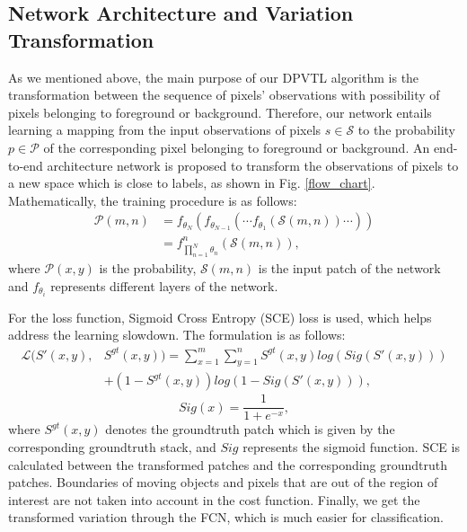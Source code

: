 \documentclass[journal]{IEEEtran}
\newcommand{\reffig}[1]{Fig. \ref{#1}}
\begin{document}
\subsection*{Network Architecture and Variation Transformation}
As we mentioned above,
the main purpose of our DPVTL algorithm is the transformation between the sequence of pixels' observations with possibility of pixels belonging to foreground or background.
Therefore,
our network entails learning a mapping from the input observations of pixels $s \in \mathcal{S}$ 
to the probability $p \in \mathcal{P}$ of the corresponding pixel belonging to foreground or background.
%
An end-to-end architecture network is proposed to transform the observations of pixels to a new space which is close to labels, as shown in \reffig{flow_chart}.
%
Mathematically, the training procedure is as follows:
\begin{equation}
    \begin{split}
        \mathcal{P}(m,n) & = f_{\theta_N} ( f_{\theta_{N - 1}} ( \cdots f_{\theta_1} ( \mathcal{S}(m,n)) \cdots  ) )  \\
          & = f_{ \prod_{n=1}^{N}\theta_n   }^n(\mathcal{S}(m,n)),
    \end{split}
\end{equation}
where $\mathcal{P}(x,y)$ is the probability, $\mathcal{S}(m,n)$ is the input patch of the network and $f_{\theta_i}$ represents different layers of the network.

For the loss function, Sigmoid Cross Entropy (SCE) loss is used, which helps address the learning slowdown. 
The formulation is as follows:
\begin{equation}
    \begin{split}
         \mathcal{L}(S'(x,y),& S^{gt}(x,y))  =  \sum_{x=1}^{m}\sum_{y=1}^{n} S^{gt}(x,y) log(Sig(S'(x,y)))  \\
        & + (1 - S^{gt}(x,y)) log(1 - Sig(S'(x,y))), 
    \end{split}
\end{equation}
\begin{equation}
       Sig(x) =\frac{1}{1+e^{-x}},
\end{equation}
where $S^{gt}(x,y)$ denotes the groundtruth patch which is given by the corresponding groundtruth stack, and $Sig$ represents the sigmoid function. 
SCE is calculated between the transformed patches and the corresponding groundtruth patches. 
Boundaries of moving objects and pixels that are out of the region of interest are not taken into account in the cost function.
Finally, we get the transformed variation through the FCN, which is much easier for classification. 
\end{document}
